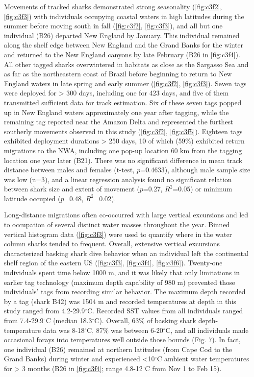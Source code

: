 Movements of tracked sharks demonstrated strong seasonality (\cref{fig:c3f2}, \cref{fig:c3f3}) with individuals occupying coastal waters in high latitudes during the summer before moving south in fall (\cref{fig:c3f2}, \cref{fig:c3f3}), and all but one individual (B26) departed New England by January. This individual remained along the shelf edge between New England and the Grand Banks for the winter and returned to the New England canyons by late February (B26 in \cref{fig:c3f4}). All other tagged sharks overwintered in habitats as close as the Sargasso Sea and as far as the northeastern coast of Brazil before beginning to return to New England waters in late spring and early summer (\cref{fig:c3f2}, \cref{fig:c3f3}). Seven tags were deployed for > 300 days, including one for 423 days, and five of them transmitted sufficient data for track estimation. Six of these seven tags popped up in New England waters approximately one year after tagging, while the remaining tag reported near the Amazon Delta and represented the furthest southerly movements observed in this study (\cref{fig:c3f2}, \cref{fig:c3f5}). Eighteen tags exhibited deployment durations > 250 days, 10 of which (59\%) exhibited return migrations to the NWA, including one pop-up location 60 km from the tagging location one year later (B21). There was no significant difference in mean track distance between males and females (t-test, $p$=0.4633), although male sample size was low (n=3), and a linear regression analysis found no significant relation between shark size and extent of movement ($p$=0.27, $R^2$=0.05) or minimum latitude occupied ($p$=0.48, $R^2$=0.02).

Long-distance migrations often co-occurred with large vertical excursions and led to occupation of several distinct water masses throughout the year. Binned vertical histogram data (\cref{fig:c3f3}) were used to quantify where in the water column sharks tended to frequent. Overall, extensive vertical excursions characterized basking shark dive behavior when an individual left the continental shelf region of the eastern US (\cref{fig:c3f3}, \cref{fig:c3f4}, \cref{fig:c3f6}). Twenty-one individuals spent time below 1000 m, and it was likely that only limitations in earlier tag technology (maximum depth capability of 980 m) prevented those individuals’ tags from recording similar behavior. The maximum depth recorded by a tag (shark B42) was 1504 m and recorded temperatures at depth in this study ranged from 4.2-29.9$^{\circ}$C. Recorded SST values from all individuals ranged from 7.4-29.9$^{\circ}$C (median 18.3$^{\circ}$C). Overall, 63\% of basking shark depth-temperature data was 8-18$^{\circ}$C, 87\% was between 6-20$^{\circ}$C, and all individuals made occasional forays into temperatures well outside those bounds (Fig. 7). In fact, one individual (B26) remained at northern latitudes (from Cape Cod to the Grand Banks) during winter and experienced <10$^{\circ}$C ambient water temperatures for > 3 months (B26 in \cref{fig:c3f4}; range 4.8-12$^{\circ}$C from Nov 1 to Feb 15). 

